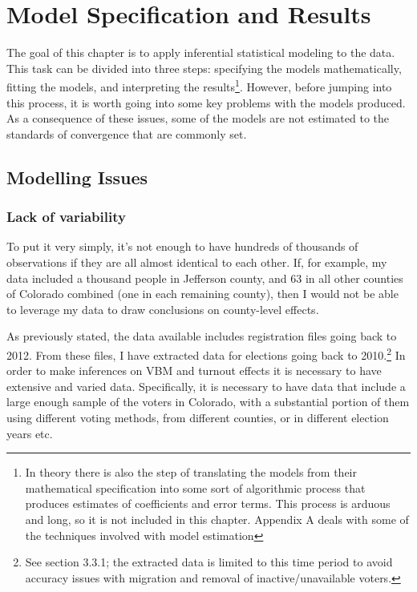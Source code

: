 \documentclass[12pt,twoside]{reedthesis}
\begin{document}
  \chapter{Model Specification and
  Results}\label{model-specification-and-results}
  
  The goal of this chapter is to apply inferential statistical modeling to
  the data. This task can be divided into three steps: specifying the
  models mathematically, fitting the models, and interpreting the
  results\footnote{In theory there is also the step of translating the
    models from their mathematical specification into some sort of
    algorithmic process that produces estimates of coefficients and error
    terms. This process is arduous and long, so it is not included in this
    chapter. Appendix A deals with some of the techniques involved with
    model estimation}. However, before jumping into this process, it is
  worth going into some key problems with the models produced. As a
  consequence of these issues, some of the models are not estimated to the
  standards of convergence that are commonly set.
  
  \section{Modelling Issues}\label{modelling-issues}
  
  \subsection{Lack of variability}\label{lack-of-variability}
  
  To put it very simply, it's not enough to have hundreds of thousands of
  observations if they are all almost identical to each other. If, for
  example, my data included a thousand people in Jefferson county, and 63
  in all other counties of Colorado combined (one in each remaining
  county), then I would not be able to leverage my data to draw
  conclusions on county-level effects.
  
  As previously stated, the data available includes registration files
  going back to 2012. From these files, I have extracted data for
  elections going back to 2010.\footnote{See section 3.3.1; the extracted
    data is limited to this time period to avoid accuracy issues with
    migration and removal of inactive/unavailable voters.} In order to
  make inferences on VBM and turnout effects it is necessary to have
  extensive and varied data. Specifically, it is necessary to have data
  that include a large enough sample of the voters in Colorado, with a
  substantial portion of them using different voting methods, from
  different counties, or in different election years etc.
  
\end{document}
